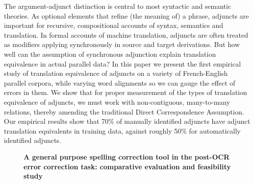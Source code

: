 \documentclass[10pt, a4paper, twopage, headinclude, footinclude, BCOR5mm]{scrartcl}
\begin{document}
        \begin{table}[t!]
    \end{table}

\noindent
The argument-adjunct distinction is central to most syntactic and semantic theories. As optional elements that refine (the meaning of) a phrase, adjuncts are important for recursive, compositional accounts of syntax, semantics and translation. In formal accounts of machine translation, adjuncts are often treated as modifiers applying synchronously in source and target derivations. But how well can the assumption of synchronous adjunction explain translation equivalence in actual parallel data? In this paper we present the first empirical study of translation equivalence of adjuncts on a variety of French-English parallel corpora, while varying word alignments so we can gauge the effect of errors in them. We show that for proper measurement of the types of translation equivalence of adjuncts, we must work with non-contiguous, many-to-many relations, thereby amending the traditional Direct Correspondence Assumption. Our empirical results show that 70\% of manually identified adjuncts have adjunct translation equivalents in training data, against roughly 50\% for automatically identified adjuncts.


\newpage

\begin{figure}[t!]
\centering
\large\textbf{A general purpose spelling correction tool in the post-OCR error correction task: comparative evaluation and feasibility study}
\vspace*{0.5cm}
\end{figure}
\end{document}
